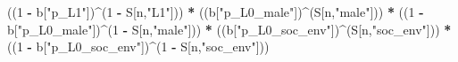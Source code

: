 \documentclass[
]{book}
\newenvironment{Shaded}{\begin{snugshade}}{\end{snugshade}}
\newcommand{\DecValTok}[1]{\textcolor[rgb]{0.00,0.00,0.81}{#1}}
\newcommand{\NormalTok}[1]{#1}
\newcommand{\SpecialCharTok}[1]{\textcolor[rgb]{0.81,0.36,0.00}{\textbf{#1}}}
\newcommand{\StringTok}[1]{\textcolor[rgb]{0.31,0.60,0.02}{#1}}
\begin{document}
\begin{Shaded}
\begin{Highlighting}[]
\NormalTok{      ((}\DecValTok{1} \SpecialCharTok{{-}}\NormalTok{ b[}\StringTok{"p\_L1"}\NormalTok{])}\SpecialCharTok{\^{}}\NormalTok{(}\DecValTok{1} \SpecialCharTok{{-}}\NormalTok{ S[n,}\StringTok{"L1"}\NormalTok{])) }\SpecialCharTok{*}
\NormalTok{      ((b[}\StringTok{"p\_L0\_male"}\NormalTok{])}\SpecialCharTok{\^{}}\NormalTok{(S[n,}\StringTok{"male"}\NormalTok{])) }\SpecialCharTok{*} 
\NormalTok{      ((}\DecValTok{1} \SpecialCharTok{{-}}\NormalTok{ b[}\StringTok{"p\_L0\_male"}\NormalTok{])}\SpecialCharTok{\^{}}\NormalTok{(}\DecValTok{1} \SpecialCharTok{{-}}\NormalTok{ S[n,}\StringTok{"male"}\NormalTok{])) }\SpecialCharTok{*} 
\NormalTok{      ((b[}\StringTok{"p\_L0\_soc\_env"}\NormalTok{])}\SpecialCharTok{\^{}}\NormalTok{(S[n,}\StringTok{"soc\_env"}\NormalTok{])) }\SpecialCharTok{*}
\NormalTok{      ((}\DecValTok{1} \SpecialCharTok{{-}}\NormalTok{ b[}\StringTok{"p\_L0\_soc\_env"}\NormalTok{])}\SpecialCharTok{\^{}}\NormalTok{(}\DecValTok{1} \SpecialCharTok{{-}}\NormalTok{ S[n,}\StringTok{"soc\_env"}\NormalTok{])) }
    

\end{Highlighting}
\end{Shaded}
\end{document}
